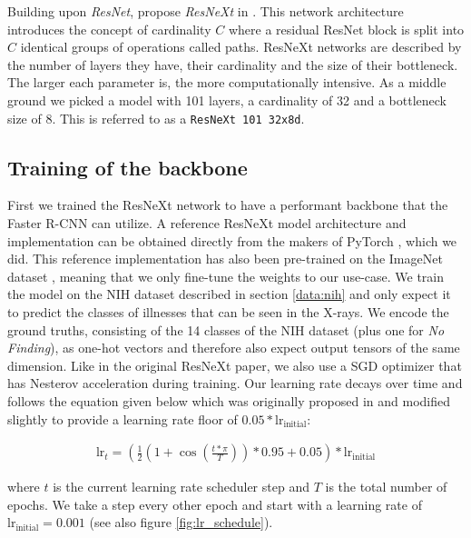 Building upon \textit{ResNet}, \citeauthor{xie_aggregated_2017} propose \textit{ResNeXt} in \autocite{xie_aggregated_2017}. This network architecture introduces the concept of cardinality $C$ where a residual ResNet block is split into $C$ identical groups of operations called paths. ResNeXt networks are described by the number of layers they have, their cardinality and the size of their bottleneck. The larger each parameter is, the more computationally intensive. As a middle ground we picked a model with 101 layers, a cardinality of 32 and a bottleneck size of 8. This is referred to as a \texttt{ResNeXt 101 32x8d}.

\subsection*{Training of the backbone}

First we trained the ResNeXt network to have a performant backbone that the Faster \ac{R-CNN} can utilize. A reference ResNeXt model architecture and implementation can be obtained directly from the makers of PyTorch \autocite{pytorch_team_resnext_nodate}, which we did. This reference implementation has also been pre-trained on the ImageNet dataset \autocite{deng_imagenet_2009}, meaning that we only fine-tune the weights to our use-case. We train the model on the NIH dataset described in section \vref{data:nih} and only expect it to predict the classes of illnesses that can be seen in the X-rays. We encode the ground truths, consisting of the 14 classes of the NIH dataset (plus one for \textit{No Finding}), as one-hot vectors and therefore also expect output tensors of the same dimension. Like in the original ResNeXt paper, we also use a \acf{SGD} optimizer that has Nesterov acceleration during training. Our learning rate decays over time and follows the equation given below which was originally proposed in \autocite{he_bag_2018} and modified slightly to provide a learning rate floor of $0.05 * \text{lr}_\text{initial}$: 

\begin{align}\label{eq:scheduler}
\text{lr}_t = \left(\frac{1}{2}\left(1 + \cos\left(\frac{t * \pi}{T}\right)\right) * 0.95 + 0.05\right) * \text{lr}_\text{initial}
\end{align}

where $t$ is the current learning rate scheduler step and $T$ is the total number of epochs. We take a step every other epoch and start with a learning rate of $\text{lr}_\text{initial} = 0.001$ (see also figure \ref{fig:lr_schedule}).

